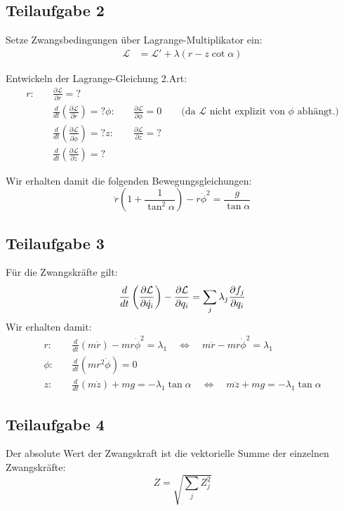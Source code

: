 \documentclass[a4paper,german,12pt,smallheadings]{scrartcl}
\begin{document}
\subsection*{Teilaufgabe 2}
Setze Zwangsbedingungen über Lagrange-Multiplikator ein:
\begin{align*}
\mathcal{L}&=\mathcal{L'} + \lambda(r-z \cot \alpha)
\end{align*}

Entwickeln der Lagrange-Gleichung 2.Art:
\begin{align*}
r: & \quad \frac{\partial \mathcal{L}}{\partial r}=?\\
& \quad \frac{d}{dt}\left(\frac{\partial \mathcal{L}}{\partial \dot{r}}\right)=?
\phi: & \quad \frac{\partial \mathcal{L}}{\partial \phi} = 0 \qquad \text{(da $\mathcal{L}$ nicht explizit von $\phi$ abhängt.)}\\
& \quad \frac{d}{dt}\left(\frac{\partial \mathcal{L}}{\partial \dot{\phi}}\right)=?
z: & \quad \frac{\partial \mathcal{L}}{\partial z}=?\\
& \quad \frac{d}{dt}\left(\frac{\partial \mathcal{L}}{\partial \dot{z}}\right)=?
\end{align*}

Wir erhalten damit die folgenden Bewegungsgleichungen:
\begin{equation*}
\ddot{r} \left(1+\frac{1}{\tan^2 \alpha}\right)-r\dot{\phi}^2=\frac{g}{\tan \alpha}
\end{equation*}

\subsection*{Teilaufgabe 3}

Für die Zwangskräfte gilt:
\begin{equation*}
\frac{d}{dt}\left(\frac{\partial \mathcal{L}}{\partial \dot{q_i}}\right)-\frac{\partial \mathcal{L}}{\partial q_i}=\sum\limits_j \lambda_j \frac{\partial f_j}{\partial q_i}\\
\end{equation*}
Wir erhalten damit:
\begin{align*}
r: & \quad \frac{d}{dt}\left(m\dot{r}\right)-mr\dot{\phi}^2=\lambda_1 \quad \Leftrightarrow \quad m\ddot{r}-mr\dot{\phi}^2=\lambda_1\\
\phi: & \quad \frac{d}{dt}\left(mr^2\dot{\phi}\right)=0\\
z: & \quad \frac{d}{dt}\left(m\dot{z}\right)+mg=-\lambda_1 \tan \alpha \quad \Leftrightarrow \quad m\ddot{z}+mg=-\lambda_1 \tan \alpha
\end{align*}

\subsection*{Teilaufgabe 4}
Der absolute Wert der Zwangskraft ist die vektorielle Summe der einzelnen Zwangskräfte:
\begin{equation*}
Z=\sqrt{\sum \limits_j Z_j^2}
\end{equation*}
\end{document}
